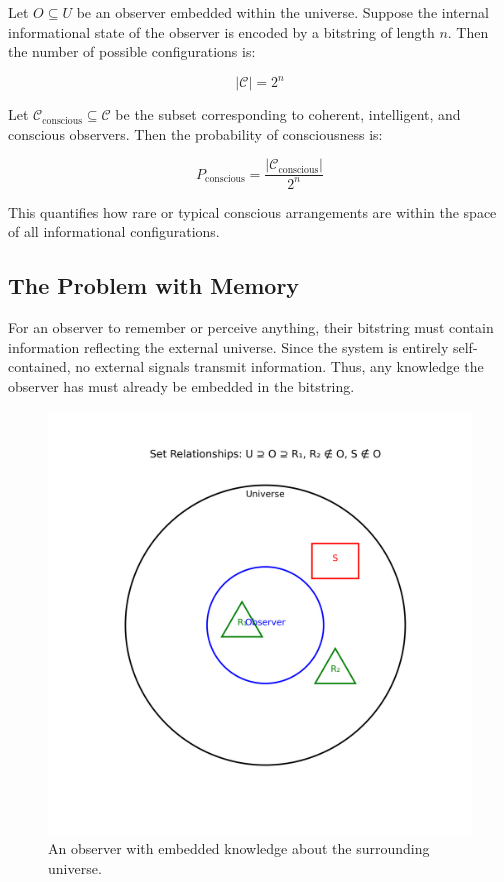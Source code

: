\documentclass[11pt]{article}
\begin{document}
Let \(O \subseteq U\) be an observer embedded within the universe. Suppose the internal informational state of the observer is encoded by a bitstring of length \(n\). Then the number of possible configurations is:

\[
      |\mathcal{C}| = 2^n
\]

Let \(\mathcal{C}_{\text{conscious}} \subseteq \mathcal{C}\) be the subset corresponding to coherent, intelligent, and conscious observers. Then the probability of consciousness is:

\[
      P_{\text{conscious}} = \frac{|\mathcal{C}_{\text{conscious}}|}{2^n}
\]

This quantifies how rare or typical conscious arrangements are within the space of all informational configurations.

\subsection{The Problem with Memory}

For an observer to remember or perceive anything, their bitstring must contain information reflecting the external universe. Since the system is entirely self-contained, no external signals transmit information. Thus, any knowledge the observer has must already be embedded in the bitstring.

\begin{figure}[h!]
      \centering
      \includegraphics[width=1.0\textwidth]{figures/memory.png}
      \caption{An observer with embedded knowledge about the surrounding universe.}
      \label{fig:memory}
\end{figure}
\end{document}
